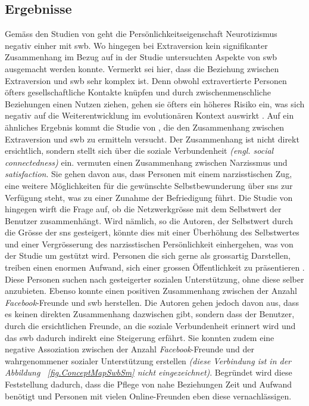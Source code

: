 \subsection{Ergebnisse}\label{subsec.traitsErgebnisse}
Gemäss den Studien von  geht die Persönlichkeitseigenschaft Neurotizismus negativ einher mit \gls{swb}. Wo hingegen bei Extraversion kein signifikanter Zusammenhang im Bezug auf in der Studie untersuchten Aspekte von \gls{swb} ausgemacht werden konnte. Vermerkt sei hier, dass die Beziehung zwischen Extraversion und \gls{swb} sehr komplex ist. Denn obwohl extravertierte Personen öfters gesellschaftliche Kontakte knüpfen und durch zwischenmenschliche Beziehungen einen Nutzen ziehen, gehen sie öfters ein höheres Risiko ein, was sich negativ auf die Weiterentwicklung im evolutionären Kontext auswirkt \cite{Nettle:2005}. Auf ein ähnliches Ergebnis kommt die Studie von , die den Zusammenhang zwischen Extraversion und \gls{swb} zu ermitteln versucht. Der Zusammenhang ist nicht direkt ersichtlich, sondern stellt sich über die soziale Verbundenheit \textit{(engl. social connectedness)} ein.\newline
{} vermuten einen Zusammenhang zwischen Narzissmus und \textit{satisfaction}. Sie gehen davon aus, dass Personen mit einem narzisstischen Zug, eine weitere Möglichkeiten  für die gewünschte Selbstbewunderung über \gls{sns} zur Verfügung steht, was zu einer Zunahme der Befriedigung führt. Die Studie von  hingegen wirft die Frage auf, ob die Netzwerkgrösse mit dem Selbstwert der Benutzer zusammenhängt. Wird nämlich, so die Autoren, der Selbstwert durch die Grösse der \gls{sns} gesteigert, könnte dies mit einer Überhöhung des Selbstwertes und einer Vergrösserung des narzisstischen Persönlichkeit einhergehen, was von der Studie um  gestützt wird. Personen die sich gerne als grossartig Darstellen, treiben einen enormen Aufwand, sich einer grossen Öffentlichkeit zu präsentieren \cite{Carpenter:2012}. Diese Personen suchen nach gesteigerter sozialen Unterstützung, ohne diese selber anzubieten. \newline
Ebenso konnte  einen positiven Zusammenhang zwischen der Anzahl \textit{Facebook}-Freunde und \gls{swb} herstellen. Die Autoren gehen jedoch davon aus, dass es keinen direkten Zusammenhang dazwischen gibt, sondern dass der Benutzer, durch die ersichtlichen Freunde, an die soziale Verbundenheit erinnert wird und das \gls{swb} dadurch indirekt eine Steigerung erfährt. Sie konnten zudem eine negative Assoziation zwischen der Anzahl \textit{Facebook}-Freunde und der wahrgenommener sozialer Unterstützung erstellen \textit{(diese Verbindung ist in der Abbildung ~\ref{fig.ConceptMapSwbSm} nicht eingezeichnet)}. Begründet wird diese Feststellung dadurch, dass  die Pflege von nahe Beziehungen Zeit und Aufwand benötigt und Personen mit vielen Online-Freunden eben diese vernachlässigen.\newline
